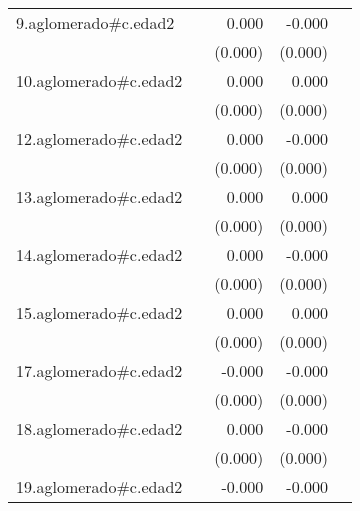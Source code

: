 {\begin{longtable}{l*{4}{D{.}{.}{-1}}}
\addlinespace
9.aglomerado#c.edad2&                     &       0.000         &      -0.000         &                     \\
            &                     &     (0.000)         &     (0.000)         &                     \\
\addlinespace
10.aglomerado#c.edad2&                     &       0.000\sym{**} &       0.000         &                     \\
            &                     &     (0.000)         &     (0.000)         &                     \\
\addlinespace
12.aglomerado#c.edad2&                     &       0.000         &      -0.000         &                     \\
            &                     &     (0.000)         &     (0.000)         &                     \\
\addlinespace
13.aglomerado#c.edad2&                     &       0.000\sym{*}  &       0.000         &                     \\
            &                     &     (0.000)         &     (0.000)         &                     \\
\addlinespace
14.aglomerado#c.edad2&                     &       0.000         &      -0.000         &                     \\
            &                     &     (0.000)         &     (0.000)         &                     \\
\addlinespace
15.aglomerado#c.edad2&                     &       0.000\sym{*}  &       0.000         &                     \\
            &                     &     (0.000)         &     (0.000)         &                     \\
\addlinespace
17.aglomerado#c.edad2&                     &      -0.000         &      -0.000\sym{***}&                     \\
            &                     &     (0.000)         &     (0.000)         &                     \\
\addlinespace
18.aglomerado#c.edad2&                     &       0.000         &      -0.000         &                     \\
            &                     &     (0.000)         &     (0.000)         &                     \\
\addlinespace
19.aglomerado#c.edad2&                     &      -0.000         &      -0.000\sym{**} &                     \\

\end{longtable}}
